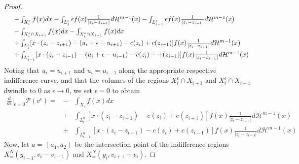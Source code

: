 \documentclass[12pt,reqno]{amsart}
\begin{document}
\begin{proof}
\[\begin{array}{ll}
     &-\int_{X_i^\epsilon}f(x)dx -\int_{L^\epsilon_i }\epsilon f(x)\frac{1}{|z_i-z_{i+1}|}d\mathcal H^{m-1}(x) 
     -\int_{L^\epsilon_{i-1}}\epsilon f(x)\frac{1}{|z_i-z_{i-1}|}d\mathcal H^{m-1}(x) \vspace{3pt}\\
     &-\int_{X_{i}^\epsilon \cap X_{i+1}}f(x)dx -\int_{X_{i}^\epsilon \cap X_{i-1}}f(x)dx\vspace{3pt}\\
     &+\int_{L^\epsilon_{i}}[x \cdot (z_{i}-z_{i+1}) - (u_{i}+\epsilon-u_{i+1}) -c(z_{i}) +c(z_{i+1}) ]f(x)\frac{1}{|z_i-z_{i+1}|}d\mathcal H^{m-1}(x)\vspace{3pt}\\
     &+
     \int_{L^\epsilon_{i-1}}[x \cdot (z_{i}-z_{i-1}) - (u_{i}+\epsilon-u_{i-1}) -c(z_{i}) -+(z_{i-1}) ]f(x)\frac{1}{|z_i-z_{i-1}|}d\mathcal H^{m-1}(x)
 \end{array}
 \]
Noting that $u_i=u_{i+1}$ and $u_i =u_{i-1}$ along the appropriate respective indifference curve, and that the volumes of the regions $X_{i}^\epsilon \cap X_{i+1}$ and $X_{i}^\epsilon \cap X_{i-1}$  dwindle to $0$ as $\epsilon \rightarrow 0$, we set $\epsilon =0$ to obtain
\begin{eqnarray}\label{optcond1}
         \frac{d}{d\epsilon}\Big|_{\epsilon=0} \mathcal P(v^\epsilon)  =
         &-&\int_{X_i}f(x)dx\label{derivative} \\
      &+&\int_{L^0_{i}}[x \cdot (z_{i}-z_{i+1})-c(z_{i}) +c(z_{i+1}) ]f(x)\frac{1}{|z_i-z_{i+1}|}d\mathcal H^{m-1}(x) \nonumber\\
&+&     \int_{L^0_{i-1}}[x \cdot (z_{i}-z_{i-1})-c(z_i) + c(z_{i-1}) ]f(x)\frac{1}{|z_i-z_{i-1}|}d\mathcal H^{m-1}(x) \nonumber
\end{eqnarray}
Now, let $a=(a_1,a_2)$ be the intersection point of the indifference regions $X^N_=(y_{i-1}, v_{i} - v_{i-1})$ and $X^N_=(y_i, v_{i+1} - v_{i})$.  






\end{proof}
\end{document}
